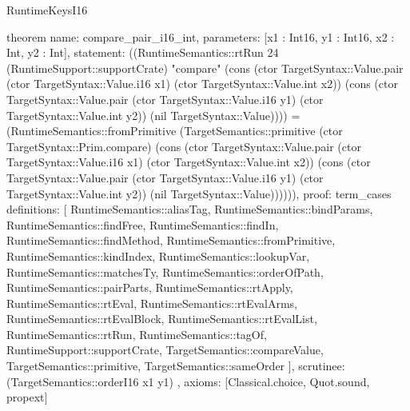 \begin{lexlean}{RuntimeKeysI16}
\begin{semanticmodule}
theorem{
  name: compare_pair_i16_int,
  parameters: [x1 : Int16, y1 : Int16, x2 : Int, y2 : Int],
  statement: ((RuntimeSemantics::rtRun 24 (RuntimeSupport::supportCrate) "compare" (cons (ctor TargetSyntax::Value.pair (ctor TargetSyntax::Value.i16 x1) (ctor TargetSyntax::Value.int x2)) (cons (ctor TargetSyntax::Value.pair (ctor TargetSyntax::Value.i16 y1) (ctor TargetSyntax::Value.int y2)) (nil TargetSyntax::Value)))) = (RuntimeSemantics::fromPrimitive (TargetSemantics::primitive (ctor TargetSyntax::Prim.compare) (cons (ctor TargetSyntax::Value.pair (ctor TargetSyntax::Value.i16 x1) (ctor TargetSyntax::Value.int x2)) (cons (ctor TargetSyntax::Value.pair (ctor TargetSyntax::Value.i16 y1) (ctor TargetSyntax::Value.int y2)) (nil TargetSyntax::Value)))))),
  proof: term_cases{
    definitions: [
      RuntimeSemantics::aliasTag,
      RuntimeSemantics::bindParams,
      RuntimeSemantics::findFree,
      RuntimeSemantics::findIn,
      RuntimeSemantics::findMethod,
      RuntimeSemantics::fromPrimitive,
      RuntimeSemantics::kindIndex,
      RuntimeSemantics::lookupVar,
      RuntimeSemantics::matchesTy,
      RuntimeSemantics::orderOfPath,
      RuntimeSemantics::pairParts,
      RuntimeSemantics::rtApply,
      RuntimeSemantics::rtEval,
      RuntimeSemantics::rtEvalArms,
      RuntimeSemantics::rtEvalBlock,
      RuntimeSemantics::rtEvalList,
      RuntimeSemantics::rtRun,
      RuntimeSemantics::tagOf,
      RuntimeSupport::supportCrate,
      TargetSemantics::compareValue,
      TargetSemantics::primitive,
      TargetSemantics::sameOrder
    ],
    scrutinee: (TargetSemantics::orderI16 x1 y1)
  },
  axioms: [Classical.choice, Quot.sound, propext]
}


\end{semanticmodule}
\end{lexlean}

